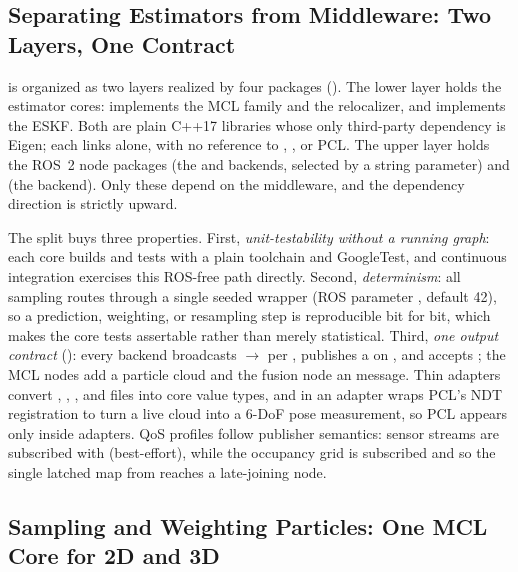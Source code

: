 \subsection{Separating Estimators from Middleware: Two Layers, One Contract}\label{sec:arch}

\sname{} is organized as two layers realized by four packages (). The lower layer holds the estimator cores:  implements the MCL family and the relocalizer, and  implements the ESKF. Both are plain C++17 libraries whose only third-party dependency is Eigen; each  links  alone, with no reference to , , or PCL. The upper layer holds the ROS~2 node packages  (the  and  backends, selected by a  string parameter) and  (the  backend). Only these depend on the middleware, and the dependency direction is strictly upward.

The split buys three properties. First, \emph{unit-testability without a running graph}: each core builds and tests with a plain toolchain and GoogleTest, and continuous integration exercises this ROS-free path directly. Second, \emph{determinism}: all sampling routes through a single seeded  wrapper (ROS parameter , default 42), so a prediction, weighting, or resampling step is reproducible bit for bit, which makes the core tests assertable rather than merely statistical. Third, \emph{one output contract} (): every backend broadcasts $\to$ per , publishes a  on , and accepts ; the MCL nodes add a particle cloud and the fusion node an  message. Thin adapters convert , , , and  files into core value types, and in  an adapter wraps PCL's NDT registration to turn a live cloud into a 6-DoF pose measurement, so PCL appears only inside adapters. QoS profiles follow publisher semantics: sensor streams are subscribed with  (best-effort), while the occupancy grid is subscribed  and  so the single latched map from  reaches a late-joining node.



\subsection{Sampling and Weighting Particles: One MCL Core for 2D and 3D}\label{sec:mcl}

